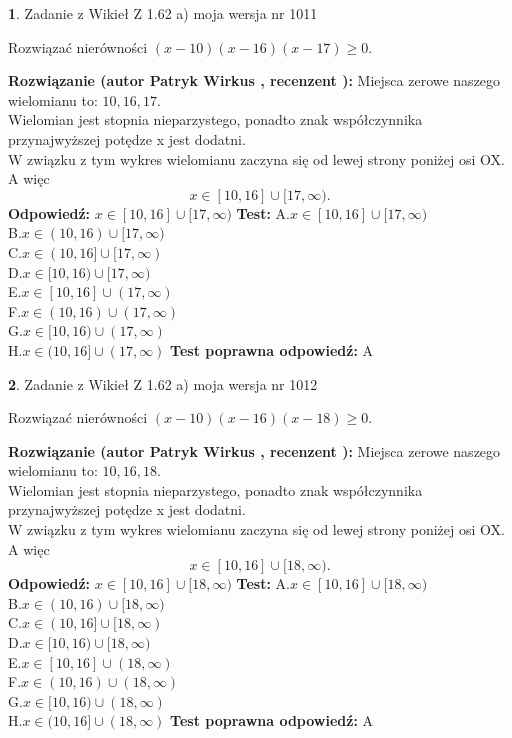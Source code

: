 \documentclass[12pt, a4paper]{article}
\theoremstyle{definition} %
\newtheorem{zad}{}
\newcommand{\zadStart}[1]{\begin{zad}#1\newline}
\newcommand{\zadStop}{\end{zad}}
\newcommand{\rozwStart}[2]{\noindent \textbf{Rozwiązanie (autor #1 , recenzent #2): }\newline}
\newcommand{\rozwStop}{\newline}
\newcommand{\odpStart}{\noindent \textbf{Odpowiedź:}\newline}
\newcommand{\odpStop}{\newline}
\newcommand{\testStart}{\noindent \textbf{Test:}\newline}
\newcommand{\testStop}{\newline}
\newcommand{\kluczStart}{\noindent \textbf{Test poprawna odpowiedź:}\newline}
\newcommand{\kluczStop}{\newline}
\begin{document}
\zadStart{Zadanie z Wikieł Z 1.62 a) moja wersja nr 1011}

Rozwiązać nierówności $(x-10)(x-16)(x-17)\ge0$.
\zadStop
\rozwStart{Patryk Wirkus}{}
Miejsca zerowe naszego wielomianu to: $10, 16, 17$.\\
Wielomian jest stopnia nieparzystego, ponadto znak współczynnika przy\linebreak najwyższej potędze x jest dodatni.\\ W związku z tym wykres wielomianu zaczyna się od lewej strony poniżej osi OX. A więc $$x \in [10,16] \cup [17,\infty).$$
\rozwStop
\odpStart
$x \in [10,16] \cup [17,\infty)$
\odpStop
\testStart
A.$x \in [10,16] \cup [17,\infty)$\\
B.$x \in (10,16) \cup [17,\infty)$\\
C.$x \in (10,16] \cup [17,\infty)$\\
D.$x \in [10,16) \cup [17,\infty)$\\
E.$x \in [10,16] \cup (17,\infty)$\\
F.$x \in (10,16) \cup (17,\infty)$\\
G.$x \in [10,16) \cup (17,\infty)$\\
H.$x \in (10,16] \cup (17,\infty)$
\testStop
\kluczStart
A
\kluczStop



\zadStart{Zadanie z Wikieł Z 1.62 a) moja wersja nr 1012}

Rozwiązać nierówności $(x-10)(x-16)(x-18)\ge0$.
\zadStop
\rozwStart{Patryk Wirkus}{}
Miejsca zerowe naszego wielomianu to: $10, 16, 18$.\\
Wielomian jest stopnia nieparzystego, ponadto znak współczynnika przy\linebreak najwyższej potędze x jest dodatni.\\ W związku z tym wykres wielomianu zaczyna się od lewej strony poniżej osi OX. A więc $$x \in [10,16] \cup [18,\infty).$$
\rozwStop
\odpStart
$x \in [10,16] \cup [18,\infty)$
\odpStop
\testStart
A.$x \in [10,16] \cup [18,\infty)$\\
B.$x \in (10,16) \cup [18,\infty)$\\
C.$x \in (10,16] \cup [18,\infty)$\\
D.$x \in [10,16) \cup [18,\infty)$\\
E.$x \in [10,16] \cup (18,\infty)$\\
F.$x \in (10,16) \cup (18,\infty)$\\
G.$x \in [10,16) \cup (18,\infty)$\\
H.$x \in (10,16] \cup (18,\infty)$
\testStop
\kluczStart
A
\kluczStop
\end{document}
